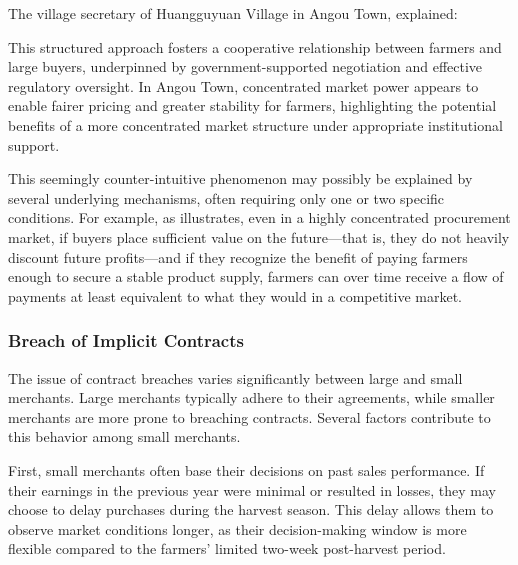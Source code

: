 The village secretary of Huangguyuan Village in Angou Town, explained:
\begin{quote}
\end{quote}
This structured approach fosters a cooperative relationship between farmers and large buyers, underpinned by government-supported negotiation and effective regulatory oversight. In Angou Town, concentrated market power appears to enable fairer pricing and greater stability for farmers, highlighting the potential benefits of a more concentrated market structure under appropriate institutional support.


This seemingly counter-intuitive phenomenon may possibly be explained by several underlying mechanisms, often requiring only one or two specific conditions. For example, as \citep{sexton2018increasing} illustrates, even in a highly concentrated procurement market, if buyers place sufficient value on the future—that is, they do not heavily discount future profits—and if they recognize the benefit of paying farmers enough to secure a stable product supply, farmers can over time receive a flow of payments at least equivalent to what they would in a competitive market.



\subsubsection{Breach of Implicit Contracts}
The issue of contract breaches varies significantly between large and small merchants. Large merchants typically adhere to their agreements, while smaller merchants are more prone to breaching contracts. Several factors contribute to this behavior among small merchants.

First, small merchants often base their decisions on past sales performance. If their earnings in the previous year were minimal or resulted in losses, they may choose to delay purchases during the harvest season. This delay allows them to observe market conditions longer, as their decision-making window is more flexible compared to the farmers' limited two-week post-harvest period.

